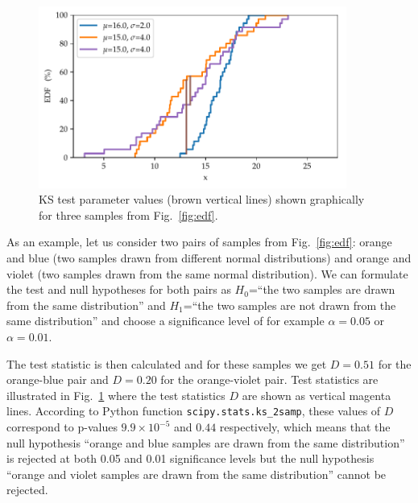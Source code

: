 \documentclass[english, oneside]{HYgradu}
\begin{document}
\begin{figure}
   \centering
   \includegraphics[width=0.9\textwidth]{kuvat/kstest.pdf}
   \caption{KS test parameter values (brown vertical lines) shown graphically for three samples from Fig.\ \ref{fig:edf}.}
   \label{fig:ks} 
\end{figure}

As an example, let us consider two pairs of samples from Fig.\ \ref{fig:edf}: orange and blue (two samples drawn from different normal distributions) and orange and violet (two samples drawn from the same normal distribution). We can formulate the test and null hypotheses for both pairs as $H_0$=``the two samples are drawn from the same distribution'' and $H_1$=``the two samples are not drawn from the same distribution'' and choose a significance level of for example $\alpha=0.05$ or $\alpha=0.01$.

The test statistic is then calculated and for these samples we get $D=0.51$ for the orange-blue pair and $D=0.20$ for the orange-violet pair. Test statistics are illustrated in Fig.\ \ref{fig:ks} where the test statistics $D$ are shown as vertical magenta lines. According to Python function \texttt{scipy.stats.ks\_2samp}, these values of $D$ correspond to p-values $9.9\times 10^{-5}$ and $0.44$ respectively, which means that the null hypothesis ``orange and blue samples are drawn from the same distribution'' is rejected at both 0.05 and 0.01 significance levels but the null hypothesis ``orange and violet samples are drawn from the same distribution'' cannot be rejected.
\end{document}
